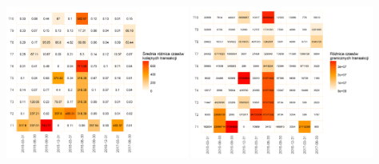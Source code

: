 \documentclass[]{beamer}
\newcommand{\sizequad}{0.45}
\begin{document}
\begin{frame}
\begin{minipage}{\textwidth}
  		 \includegraphics[width=\sizequad\textwidth]{pictures/roznica_czasow/roznica_czasow_hm.png}\quad
  		 \includegraphics[width=\sizequad\textwidth]{pictures/czas_graniczny/czas_graniczny_hm.png}
 \end{minipage} 
\end{frame}
\end{document}

